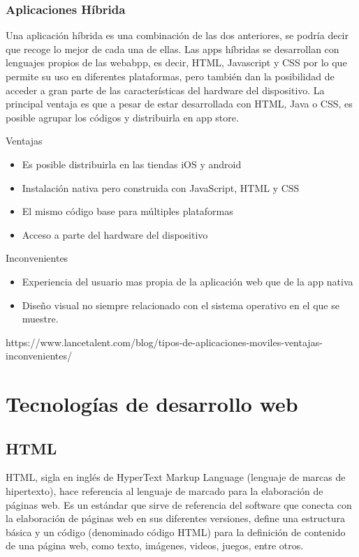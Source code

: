 \subsubsection{Aplicaciones Híbrida}
\setlength{\parskip}{5mm}
Una aplicación híbrida es una combinación de las dos anteriores, se podría decir que recoge lo mejor de cada una de ellas. Las apps híbridas se desarrollan con lenguajes propios de las webabpp, es decir, HTML, Javascript y CSS por lo que permite su uso en diferentes plataformas, pero también dan la posibilidad de acceder a gran parte de las características del hardware del dispositivo. La principal ventaja es que a pesar de estar desarrollada con HTML, Java o CSS, es posible agrupar los códigos y distribuirla en app store.


Ventajas
\setlength{\parskip}{0mm}
\begin{itemize}

	\item Es posible distribuirla en las tiendas iOS y android 
	
	\item Instalación nativa pero construida con JavaScript, HTML y CSS
	
	\item El mismo código base para múltiples plataformas
	
	\item Acceso a parte del hardware del dispositivo
	
\end{itemize}

Inconvenientes

\begin{itemize}

	\item Experiencia del usuario mas propia de la aplicación web que de la app nativa
	
	\item Diseño visual no siempre relacionado con el sistema operativo en el que se muestre.
	
\end{itemize}


https://www.lancetalent.com/blog/tipos-de-aplicaciones-moviles-ventajas-inconvenientes/
\section{Tecnologías de desarrollo web}

\subsection{HTML}
\setlength{\parskip}{5mm}
HTML, sigla en inglés de HyperText Markup Language (lenguaje de marcas de hipertexto), hace referencia al lenguaje de marcado para la elaboración de páginas web. Es un estándar que sirve de referencia del software que conecta con la elaboración de páginas web en sus diferentes versiones, define una estructura básica y un código (denominado código HTML) para la definición de contenido de una página web, como texto, imágenes, videos, juegos, entre otros. 

